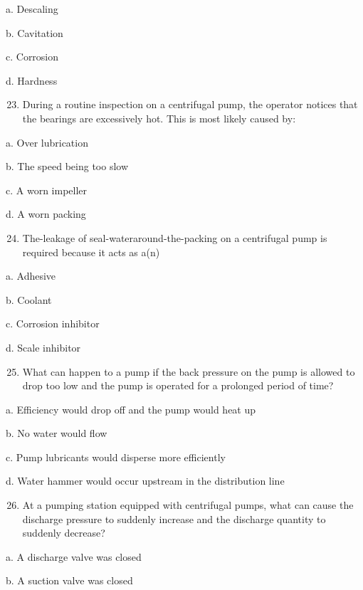 \documentclass[10pt]{article}
\begin{document}
\begin{enumerate}
\begin{enumerate}
a. Descaling

b. Cavitation

c. Corrosion

d. Hardness

\begin{enumerate}
  \setcounter{enumi}{22}
  \item During a routine inspection on a centrifugal pump, the operator notices that the bearings are excessively hot. This is most likely caused by:
\end{enumerate}

a. Over lubrication

b. The speed being too slow

c. A worn impeller

d. A worn packing

\begin{enumerate}
  \setcounter{enumi}{23}
  \item The-leakage of seal-wateraround-the-packing on a centrifugal pump is required because it acts as a(n)
\end{enumerate}

a. Adhesive

b. Coolant

c. Corrosion inhibitor

d. Scale inhibitor

\begin{enumerate}
  \setcounter{enumi}{24}
  \item What can happen to a pump if the back pressure on the pump is allowed to drop too low and the pump is operated for a prolonged period of time?
\end{enumerate}

a. Efficiency would drop off and the pump would heat up

b. No water would flow

c. Pump lubricants would disperse more efficiently

d. Water hammer would occur upstream in the distribution line

\begin{enumerate}
  \setcounter{enumi}{25}
  \item At a pumping station equipped with centrifugal pumps, what can cause the discharge pressure to suddenly increase and the discharge quantity to suddenly decrease?
\end{enumerate}

a. A discharge valve was closed

b. A suction valve was closed


\end{enumerate}
\end{enumerate}
\end{document}
